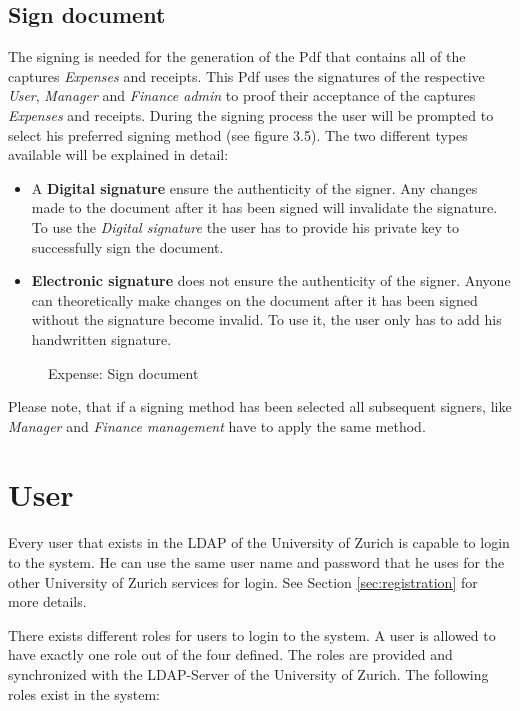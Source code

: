 \subsection{Sign document}
\label{sec:signing}
The signing is needed for the generation of the Pdf that contains all of the captures \textit{Expenses} and receipts. This Pdf uses the signatures of the respective \textit{User}, \textit{Manager} and \textit{Finance admin} to proof their acceptance of the captures \textit{Expenses} and receipts. During the signing process the user will be prompted to select his preferred signing method (see figure 3.5). The two different types available will be explained in detail:
    \begin{itemize}
        \item A \textbf{Digital signature} ensure the authenticity of the signer. Any changes made to the document after it has been signed will invalidate the signature. To use the \textit{Digital signature} the user has to provide his private key to successfully sign the document.
        \item \textbf{Electronic signature} does not ensure the authenticity of the signer. Anyone can theoretically make changes on the document after it has been signed without the signature become invalid. To use it, the user only has to add his handwritten signature.
    \end{itemize}
    
\begin{figure}[H]
    \centering
    \caption{Expense: Sign document}
    \label{fig:expense-sign}
\end{figure}

Please note, that if a signing method has been selected all subsequent signers, like \textit{Manager} and \textit{Finance management} have to apply the same method.


\section{User}

Every user that exists in the LDAP of the University of Zurich is capable to login to the system. He can use the same user name and password that he uses for the other University of Zurich services for login. See Section \ref{sec:registration} for more details.

There exists different roles for users to login to the system. A user is allowed to have exactly one role out of the four defined. The roles are provided and synchronized with the LDAP-Server of the University of Zurich. The following roles exist in the system:

